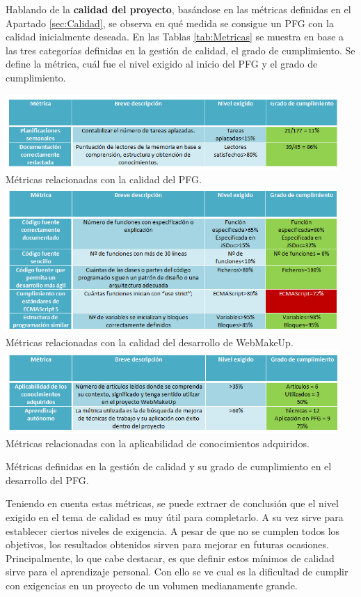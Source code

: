 Hablando de la \textbf{calidad del proyecto}, basándose en las métricas definidas en el Apartado \ref{sec:Calidad}, se observa en qué medida se consigue un PFG con la calidad inicialmente deseada. En las Tablas \ref{tab:Metricas} se muestra en base a las tres categorías definidas en la gestión de calidad, el grado de cumplimiento. Se define la métrica, cuál fue el nivel exigido al inicio del PFG y el grado de cumplimiento.

\begin{table}
\begin{center}
\includegraphics[width=0.95\textwidth]{figs/6-MetricasPFG.png}
Métricas relacionadas con la calidad del PFG.
\includegraphics[width=0.95\textwidth]{figs/6-MetricasWebMakeUp.png}
Métricas relacionadas con la calidad del desarrollo de WebMakeUp.
\includegraphics[width=0.95\textwidth]{figs/6-MetricasConocimientos.png}
Métricas relacionadas con la aplicabilidad de conocimientos adquiridos.
\end{center}
\caption{Métricas definidas en la gestión de calidad y su grado de cumplimiento en el desarrollo del PFG.}
\label{tab:Metricas}
\end{table}

Teniendo en cuenta estas métricas, se puede extraer de conclusión que el nivel exigido en el tema de calidad es muy útil para completarlo. A su vez sirve para establecer ciertos niveles de exigencia. A pesar de que no se cumplen todos los objetivos, los resultados obtenidos sirven para mejorar en futuras ocasiones. Principalmente, lo que cabe destacar, es que definir estos mínimos de calidad sirve para el aprendizaje personal. Con ello se ve cual es la dificultad de cumplir con exigencias en un proyecto de un volumen medianamente grande.
